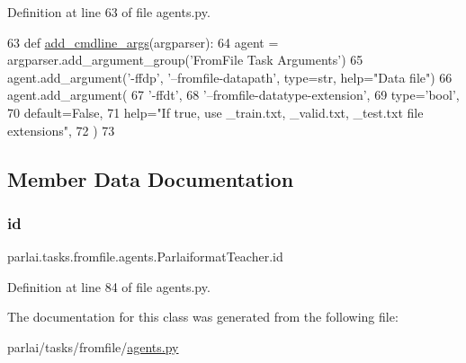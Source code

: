 Definition at line 63 of file agents.\+py.


\begin{DoxyCode}
63     \textcolor{keyword}{def }\hyperlink{namespaceparlai_1_1agents_1_1drqa_1_1config_a62fdd5554f1da6be0cba185271058320}{add\_cmdline\_args}(argparser):
64         agent = argparser.add\_argument\_group(\textcolor{stringliteral}{'FromFile Task Arguments'})
65         agent.add\_argument(\textcolor{stringliteral}{'-ffdp'}, \textcolor{stringliteral}{'--fromfile-datapath'}, type=str, help=\textcolor{stringliteral}{"Data file"})
66         agent.add\_argument(
67             \textcolor{stringliteral}{'-ffdt'},
68             \textcolor{stringliteral}{'--fromfile-datatype-extension'},
69             type=\textcolor{stringliteral}{'bool'},
70             default=\textcolor{keyword}{False},
71             help=\textcolor{stringliteral}{"If true, use \_train.txt, \_valid.txt, \_test.txt file extensions"},
72         )
73 
\end{DoxyCode}


\subsection{Member Data Documentation}
\mbox{\label{classparlai_1_1tasks_1_1fromfile_1_1agents_1_1ParlaiformatTeacher_af21d1457ab02cd0d2d0583d1c543004f}} 
\subsubsection{\texorpdfstring{id}{id}}
{\footnotesize\ttfamily parlai.\+tasks.\+fromfile.\+agents.\+Parlaiformat\+Teacher.\+id}



Definition at line 84 of file agents.\+py.



The documentation for this class was generated from the following file\+:\begin{DoxyCompactItemize}
\item 
parlai/tasks/fromfile/\hyperlink{parlai_2tasks_2fromfile_2agents_8py}{agents.\+py}\end{DoxyCompactItemize}
